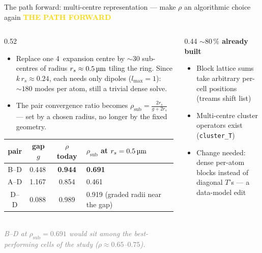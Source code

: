 \documentclass[10pt,aspectratio=169]{beamer}
\newcommand{\kicker}[1]{{\footnotesize\bfseries\textcolor{gold}{#1}}\\[-0.4ex]}
\newcommand{\um}{\,\text{\textmu m}}
\begin{document}
\begin{frame}{The path forward: multi-centre representation --- make $\rho$ an algorithmic choice again}
  \kicker{THE PATH FORWARD}
  \begin{columns}[t]
    \begin{column}{0.52\textwidth}
      \begin{itemize}\small
        \item Replace one 4\um{} expansion centre by ${\sim}30$ sub-centres of radius $r_s \approx 0.5\um$ tiling the ring.
              Since $k\,r_s \approx 0.24$, each needs only dipoles ($l_{\max}=1$): ${\sim}180$ modes per atom, still a trivial dense solve.
        \item The pair convergence ratio becomes
              $\displaystyle \rho_{\text{sub}} = \frac{2 r_s}{g + 2 r_s}$
              --- set by a chosen radius, no longer by the fixed geometry.
      \end{itemize}
      \begin{center}\footnotesize
      \begin{tabular}{@{}cccl@{}}
        \toprule
        pair & gap $g$ & $\rho$ today & $\rho_{\text{sub}}$ at $r_s = 0.5\um$ \\
        \midrule
        B--D & 0.448\um & \textbf{0.944} & \textcolor{good}{\textbf{0.691}} \\
        A--D & 1.167\um & 0.854 & \textcolor{good}{0.461} \\
        D--D & 0.088\um & 0.989 & \textcolor{warn}{0.919 (graded radii near the gap)} \\
        \bottomrule
      \end{tabular}\\
      {\scriptsize\textit{\textcolor{gray}{B--D at $\rho_{\text{sub}} = 0.691$ would sit among the
      best-performing cells of the study ($\rho \approx 0.65$--$0.75$).}}}
      \end{center}
    \end{column}
    \begin{column}{0.44\textwidth}
      {\textcolor{good}{\textbf{${\sim}80\,\%$ already built}}}
      \begin{itemize}\footnotesize
        \item Block lattice sums take arbitrary per-cell positions (treams shift list)
        \item Multi-centre cluster operators exist (\texttt{cluster\_T})
        \item Change needed: dense per-atom blocks instead of diagonal $T$'s --- a data-model edit

\end{itemize}
\end{column}
\end{columns}
\end{frame}
\end{document}
